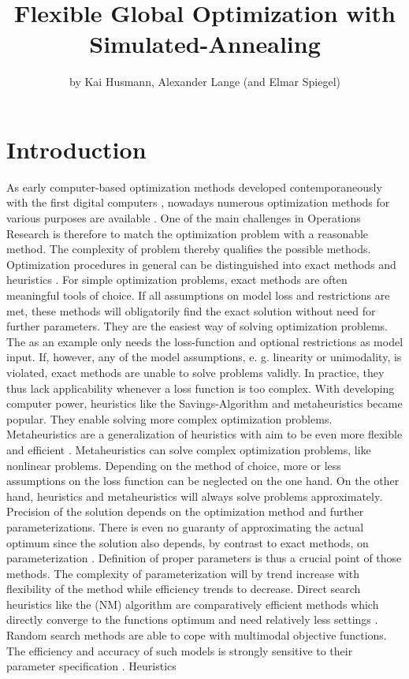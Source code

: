 \title{Flexible Global Optimization with Simulated-Annealing}
\author{by Kai Husmann, Alexander Lange (and Elmar Spiegel)}

\maketitle


\section{Introduction}
As early computer-based optimization methods developed contemporaneously with the first digital computers \citep{corana_1987}, nowadays numerous optimization methods for various purposes are available \citep{wegener_2005}. One of the main challenges in Operations Research is therefore to match the optimization problem with a reasonable method. The complexity of problem thereby qualifies the possible methods. Optimization procedures in general can be distinguished into exact methods and heuristics \citep{kirkpatrick_1983}. For simple optimization problems, exact methods are often meaningful tools of choice. If all assumptions on model loss and restrictions are met, these methods will obligatorily find the exact solution without need for further parameters. They are the easiest way of solving optimization problems. The   \citep{dantzig_1959} as an example only needs the loss-function and optional restrictions as model input. If, however, any of the model assumptions, e. g. linearity or unimodality, is violated, exact methods are unable to solve problems validly. In practice, they thus lack applicability whenever a loss function is too complex. With developing computer power, heuristics like the Savings-Algorithm \citep{clarke_1964} and metaheuristics became popular. They enable solving more complex optimization problems. Metaheuristics are a generalization of heuristics with aim to be even more flexible and efficient \citep{blum_2003}. Metaheuristics can solve complex optimization problems, like nonlinear problems. Depending on the method of choice, more or less assumptions on the loss function can be neglected on the one hand. On the other hand, heuristics and metaheuristics will always solve problems approximately. Precision of the solution depends on the optimization method and further parameterizations. There is even no guaranty of approximating the actual optimum since the solution also depends, by contrast to exact methods, on parameterization \citep{blum_2003}. Definition of proper parameters is thus a crucial point of those methods. The complexity of parameterization will by trend increase with flexibility of the method while efficiency trends to decrease. Direct search heuristics like the  (NM) algorithm are comparatively efficient methods which directly converge to the functions optimum and need relatively less settings \citep{geiger_1999}. Random search methods are able to cope with multimodal objective functions. The efficiency and accuracy of such models is strongly sensitive to their parameter specification \citep{corana_1987}. Heuristics 